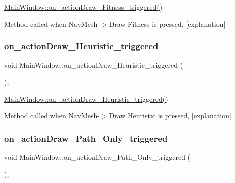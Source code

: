 \hyperlink{class_main_window_a52e0431a7a166f48f8297a05eb42865d}{Main\+Window\+::on\+\_\+action\+Draw\+\_\+\+Fitness\+\_\+triggered()} 

Method called when Nav\+Mesh-\/$>$Draw Fitness is pressed, \mbox{[}explanation\mbox{]} \mbox{\label{class_main_window_a0b1b90a4abe0e73730a9c7fa58163c9d}} 
\subsubsection{\texorpdfstring{on\+\_\+action\+Draw\+\_\+\+Heuristic\+\_\+triggered}{on\_actionDraw\_Heuristic\_triggered}}
{\footnotesize\ttfamily void Main\+Window\+::on\+\_\+action\+Draw\+\_\+\+Heuristic\+\_\+triggered (\begin{DoxyParamCaption}{ }\end{DoxyParamCaption})\hspace{0.3cm}{\ttfamily [private]}, {\ttfamily [slot]}}



\hyperlink{class_main_window_a0b1b90a4abe0e73730a9c7fa58163c9d}{Main\+Window\+::on\+\_\+action\+Draw\+\_\+\+Heuristic\+\_\+triggered()} 

Method called when Nav\+Mesh-\/$>$Draw Heuristic is pressed, \mbox{[}explanation\mbox{]} \mbox{\label{class_main_window_aa53ce2c98696444f4508a566b42e1c93}} 
\subsubsection{\texorpdfstring{on\+\_\+action\+Draw\+\_\+\+Path\+\_\+\+Only\+\_\+triggered}{on\_actionDraw\_Path\_Only\_triggered}}
{\footnotesize\ttfamily void Main\+Window\+::on\+\_\+action\+Draw\+\_\+\+Path\+\_\+\+Only\+\_\+triggered (\begin{DoxyParamCaption}{ }\end{DoxyParamCaption})\hspace{0.3cm}{\ttfamily [private]}, {\ttfamily [slot]}}



